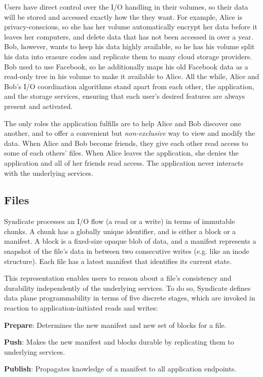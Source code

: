 Users have direct control over the I/O handling in their volumes, so their data
will be stored and accessed exactly how the they want. For example, Alice is
privacy-conscious, so she has her volume automatically encrypt her data before
it leaves her computers, and delete data that has not been accessed in over a
year. Bob, however, wants to keep his data highly available, so he has his
volume split his data into erasure codes and replicate them to many cloud
storage providers. Bob used to use Facebook, so he additionally maps his old
Facebook data as a read-only tree in his volume to make it available to Alice.
All the while, Alice and Bob's I/O coordination algorithms stand apart from
each other, the application, and the storage services, ensuring that each
user's desired features are always present and activated.

The only roles the application fulfills are to help Alice and Bob discover one
another, and to offer a convenient but \textit{non-exclusive} way to view and modify the
data. When Alice and Bob become friends, they give each other read access to
some of each others' files. When Alice leaves the application, she denies
the application and all of her friends read access. The application never
interacts with the underlying services.

\subsection{Files}

Syndicate processes an I/O flow (a read or a write) in terms of immutable
chunks. A chunk has a globally unique identifier, and is either a block or a
manifest. A block is a fixed-size opaque blob of data, and a manifest represents
a snapshot of the file's data in between two consecutive writes (e.g. like
an inode structure). Each file has a latest manifest that identifies its current
state.

This representation enables users to reason about a file's consistency and
durability independently of the underlying services. To do so, Syndicate defines
data plane programmability in terms of five discrete stages, which are invoked
in reaction to application-initiated reads and writes:

\textbf{Prepare}: Determines the new manifest and new set of blocks for a file.

\textbf{Push}: Makes the new manifest and blocks durable by replicating them to underlying services.

\textbf{Publish}: Propagates knowledge of a manifest to all application endpoints.

